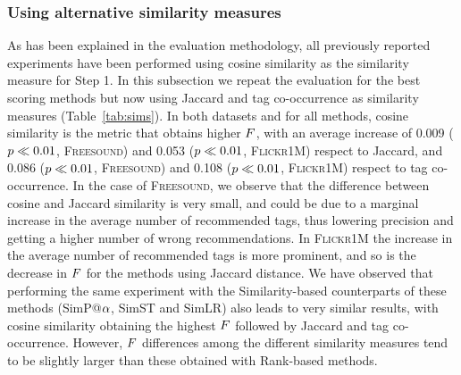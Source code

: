 \subsubsection{Using alternative similarity measures}

As has been explained in the evaluation methodology, all previously reported experiments have been performed using cosine similarity as the similarity measure for Step 1. 
In this subsection we repeat the evaluation for the best scoring methods but now using Jaccard and tag co-occurrence as similarity measures (Table~\ref{tab:sims}). In both datasets and for all methods, cosine similarity is the metric that obtains higher $F$, with an average increase of 0.009 ($p\ll0.01$, \textsc{Freesound}) and 0.053 ($p\ll0.01$, \textsc{Flickr1M}) respect to Jaccard, and 0.086 ($p\ll0.01$, \textsc{Freesound}) and 0.108 ($p\ll0.01$, \textsc{Flickr1M}) respect to tag co-occurrence. In the case of \textsc{Freesound}, we observe that the difference between cosine and Jaccard similarity is very small, and could be due to a marginal increase in the average number of recommended tags, thus lowering precision and getting a higher number of wrong recommendations. In \textsc{Flickr1M} the increase in the average number of recommended tags is more prominent, and so is the decrease in $F$ for the methods using Jaccard distance.
We have observed that performing the same experiment with the Similarity-based counterparts of these methods (SimP@$\alpha$, SimST and SimLR) also leads to very similar results, with cosine similarity obtaining the highest $F$ followed by Jaccard and tag co-occurrence. However, $F$ differences among the different similarity measures tend to be slightly larger than these obtained with Rank-based methods.


